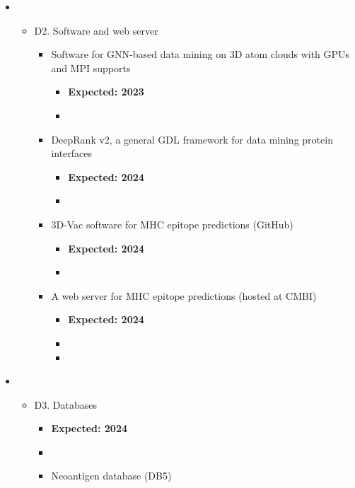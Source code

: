 \begin{itemize}
\item \begin{itemize}
\item D2. Software and web server
\begin{itemize}
\item Software for GNN-based data mining on 3D atom clouds with GPUs and MPI supports
\begin{itemize}
\item \textbf{Expected: 2023}
\item {}
\end{itemize}
\item DeepRank v2, a general GDL framework for data mining protein interfaces
\begin{itemize}
\item \textbf{Expected: 2024}
\item {}
\end{itemize}
\item 3D-Vac software for MHC epitope predictions (GitHub)
\begin{itemize}
\item \textbf{Expected: 2024}
\item {}
\end{itemize}
\item A web server for MHC epitope predictions (hosted at CMBI)
\begin{itemize}
\item \textbf{Expected: 2024}
\item {}
\item {}
\end{itemize}
\end{itemize}
\end{itemize}
\end{itemize}

\begin{itemize}
\item \begin{itemize}
\item D3. Databases
\begin{itemize}
\item \textbf{Expected: 2024}
\item {}
\item Neoantigen database (DB5)
\end{itemize}
\end{itemize}
\end{itemize}



